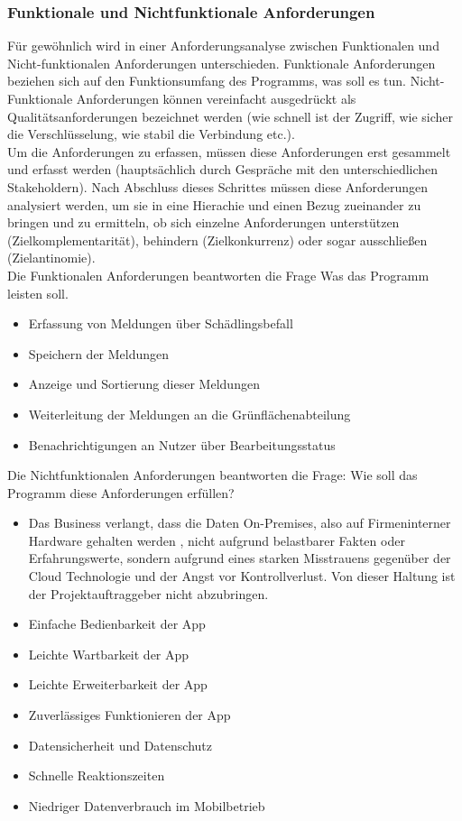 \subsubsection{Funktionale und Nichtfunktionale Anforderungen}

Für gewöhnlich wird in einer Anforderungsanalyse zwischen Funktionalen und Nicht-funktionalen Anforderungen unterschieden. Funktionale Anforderungen beziehen sich auf den Funktionsumfang des Programms, was soll es tun. Nicht-Funktionale Anforderungen können vereinfacht ausgedrückt als Qualitätsanforderungen bezeichnet werden (wie schnell ist der Zugriff, wie sicher die Verschlüsselung, wie stabil die Verbindung etc.).\\

Um die Anforderungen zu erfassen, müssen diese Anforderungen erst gesammelt und erfasst werden (hauptsächlich durch Gespräche mit den unterschiedlichen Stakeholdern). Nach Abschluss dieses Schrittes müssen diese Anforderungen analysiert werden, um sie in eine Hierachie und einen Bezug zueinander zu bringen und zu ermitteln, ob sich einzelne Anforderungen unterstützen (Zielkomplementarität), behindern (Zielkonkurrenz) oder sogar ausschließen (Zielantinomie).\\


Die Funktionalen Anforderungen beantworten die Frage Was das Programm leisten soll.
\begin{itemize}
  \item Erfassung von Meldungen über Schädlingsbefall
  \item Speichern der Meldungen
  \item Anzeige und Sortierung dieser Meldungen
    \item Weiterleitung der Meldungen an die Grünflächenabteilung
    \item Benachrichtigungen an Nutzer über Bearbeitungsstatus
\end{itemize}

Die Nichtfunktionalen Anforderungen beantworten die Frage: Wie soll das Programm diese Anforderungen erfüllen?

\begin{itemize}
  \item Das Business verlangt, dass die Daten On-Premises, also auf Firmeninterner Hardware gehalten werden \cite{onPremise}, nicht aufgrund belastbarer Fakten oder Erfahrungswerte, sondern aufgrund eines starken Misstrauens gegenüber der Cloud Technologie und der Angst vor Kontrollverlust. Von dieser Haltung ist der Projektauftraggeber nicht abzubringen.
  \item  Einfache Bedienbarkeit der App
  \item Leichte Wartbarkeit der App
  \item Leichte Erweiterbarkeit der App
  \item Zuverlässiges Funktionieren der App
  \item Datensicherheit und Datenschutz
  \item Schnelle Reaktionszeiten
  \item Niedriger Datenverbrauch im Mobilbetrieb
\end{itemize}

